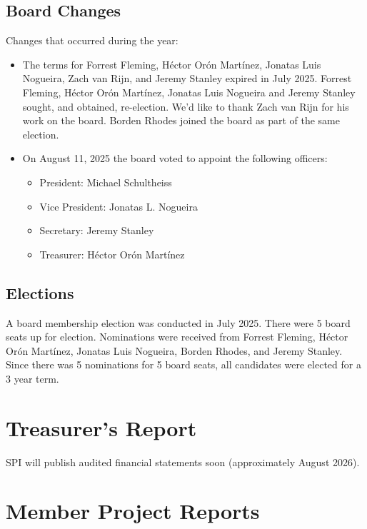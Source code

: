 \documentclass[a4paper]{report}
\begin{document}
\section{Board Changes}

Changes that occurred during the year:

\begin{itemize}

\item The terms for Forrest Fleming, Héctor Orón Martínez, Jonatas Luis Nogueira, Zach van Rijn, and Jeremy Stanley expired in July 2025.  Forrest Fleming, Héctor Orón Martínez, Jonatas Luis Nogueira and Jeremy Stanley sought, and obtained, re-election.  We'd like to thank Zach van Rijn for his work on the board.  Borden Rhodes joined the board as part of the same election.

\item On August 11, 2025 the board voted to appoint the following officers:

\begin{itemize}
\item President: Michael Schultheiss
\item Vice President: Jonatas L. Nogueira
\item Secretary: Jeremy Stanley
\item Treasurer: Héctor Orón Martínez
\end{itemize}

\end{itemize}

\section{Elections}

A board membership election was conducted in July 2025.  There were 5 board seats up for election.  Nominations were received from Forrest Fleming, Héctor Orón Martínez, Jonatas Luis Nogueira, Borden Rhodes, and Jeremy Stanley.  Since there was 5 nominations for 5 board seats, all candidates were elected for a 3 year term.

\chapter{Treasurer's Report}

SPI will publish audited financial statements soon (approximately August 2026).

\chapter{Member Project Reports}
\end{document}
